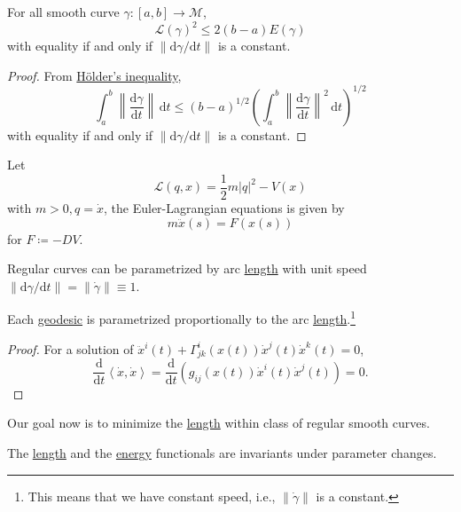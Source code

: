 \begin{proposition}
	For all smooth curve \(\gamma \colon [a, b] \to \mathcal{M} \),
	\[
		\mathcal{L} (\gamma )^2 \leq 2(b-a) E(\gamma )
	\]
	with equality if and only if \(\lVert \mathrm{d} \gamma / \mathrm{d} t \rVert \) is a constant.
\end{proposition}
\begin{proof}
	From \href{https://en.wikipedia.org/wiki/H%C3%B6lder%27s_inequality}{Hölder's inequality},
	\[
		\int_{a}^{b} \left\lVert \frac{\mathrm{d}\gamma }{\mathrm{d}t} \right\rVert \,\mathrm{d}t
		\leq (b-a)^{1 / 2} \left( \int_{a}^{b} \left\lVert \frac{\mathrm{d}\gamma }{\mathrm{d}t} \right\rVert ^2 \,\mathrm{d}t \right) ^{1 / 2}
	\]
	with equality if and only if \(\lVert \mathrm{d} \gamma / \mathrm{d} t \rVert\) is a constant.
\end{proof}

\begin{eg}
	Let
	\[
		\mathcal{L} (q, x) = \frac{1}{2} m \vert q \vert ^2 - V(x)
	\]
	with \(m > 0, q = \dot{x}\), the Euler-Lagrangian equations is given by
	\[
		m\ddot{x} (s) = F(x(s))
	\]
	for \(F\coloneqq -DV\).
\end{eg}

\begin{prev}
	Regular curves can be parametrized by arc \hyperref[def:length]{length} with unit speed \(\lVert \mathrm{d} \gamma / \mathrm{d} t \rVert = \lVert \dot{\gamma } \rVert \equiv 1\).
\end{prev}

\begin{lemma}
	Each \hyperref[def:geodesic]{geodesic} is parametrized proportionally to the arc \hyperref[def:length]{length}.\footnote{This means that we have constant speed, i.e., \(\lVert \dot{\gamma } \rVert \) is a constant.}
\end{lemma}
\begin{proof}
	For a solution of \(\ddot{x}^i(t) + \Gamma ^{i}_{jk}(x(t)) \dot{x}^j(t)\dot{x}^k(t) = 0\),
	\[
		\frac{\mathrm{d}}{\mathrm{d}t} \left\langle \dot{x}, \dot{x} \right\rangle
		= \frac{\mathrm{d}}{\mathrm{d}t} \left( g_{ij} (x(t)) \dot{x}^i(t)\dot{x}^j(t)\right)
		=0.
	\]
\end{proof}

Our goal now is to minimize the \hyperref[def:length]{length} within class of regular smooth curves.

\begin{prev}
	The \hyperref[def:length]{length} and the \hyperref[def:energy]{energy} functionals are invariants under parameter changes.
\end{prev}

